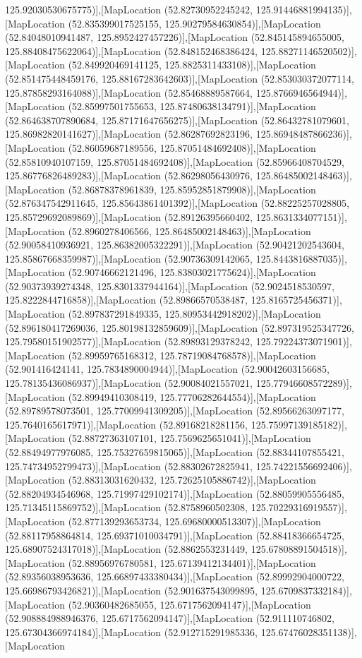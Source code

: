 125.92030530675775)],[MapLocation (52.82730952245242, 125.91446881994135)],[MapLocation (52.835399017525155, 125.90279584630854)],[MapLocation (52.84048010941487, 125.8952427457226)],[MapLocation (52.845145894655005, 125.88408475622064)],[MapLocation (52.848152468386424, 125.88271146520502)],[MapLocation (52.849920469141125, 125.8825311433108)],[MapLocation (52.851475448459176, 125.88167283642603)],[MapLocation (52.853030372077114, 125.87858293164088)],[MapLocation (52.85468889587664, 125.8766946564944)],[MapLocation (52.85997501755653, 125.87480638134791)],[MapLocation (52.864638707890684, 125.87171647656275)],[MapLocation (52.86432781079601, 125.86982820141627)],[MapLocation (52.86287692823196, 125.86948487866236)],[MapLocation (52.86059687189556, 125.87051484692408)],[MapLocation (52.85810940107159, 125.87051484692408)],[MapLocation (52.85966408704529, 125.86776826489283)],[MapLocation (52.86298056430976, 125.86485002148463)],[MapLocation (52.86878378961839, 125.85952851879908)],[MapLocation (52.876347542911645, 125.85643861401392)],[MapLocation (52.88225257028805, 125.85729692089869)],[MapLocation (52.89126395660402, 125.8631334077151)],[MapLocation (52.8960278406566, 125.86485002148463)],[MapLocation (52.90058410936921, 125.86382005322291)],[MapLocation (52.90421202543604, 125.85867668359987)],[MapLocation (52.90736309142065, 125.8443816887035)],[MapLocation (52.90746662121496, 125.83803021775624)],[MapLocation (52.90373939274348, 125.8301337944164)],[MapLocation (52.9024518530597, 125.8222844716858)],[MapLocation (52.89866570538487, 125.8165725456371)],[MapLocation (52.897837291849335, 125.80953442918202)],[MapLocation (52.896180417269036, 125.80198132859609)],[MapLocation (52.897319525347726, 125.79580151902577)],[MapLocation (52.89893129378242, 125.79224373071901)],[MapLocation (52.89959765168312, 125.78719084768578)],[MapLocation (52.901416424141, 125.7834890004944)],[MapLocation (52.90042603156685, 125.78135436086937)],[MapLocation (52.90084021557021, 125.77946608572289)],[MapLocation (52.89949410308419, 125.77706282644554)],[MapLocation (52.89789578073501, 125.77009941309205)],[MapLocation (52.89566263097177, 125.7640165617971)],[MapLocation (52.89168218281156, 125.75997139185182)],[MapLocation (52.88727363107101, 125.7569625651041)],[MapLocation (52.88494977976085, 125.75327659815065)],[MapLocation (52.88344107855421, 125.74734952799473)],[MapLocation (52.88302672825941, 125.74221556692406)],[MapLocation (52.88313031620432, 125.72625105886742)],[MapLocation (52.88204934546968, 125.71997429102174)],[MapLocation (52.88059905556485, 125.71345115869752)],[MapLocation (52.8758960502308, 125.70229316919557)],[MapLocation (52.877139293653734, 125.69680000513307)],[MapLocation (52.88117958864814, 125.69371010034791)],[MapLocation (52.88418366654725, 125.68907524317018)],[MapLocation (52.8862553231449, 125.67808891504518)],[MapLocation (52.88956976780581, 125.67139412134401)],[MapLocation (52.89356038953636, 125.66897433380434)],[MapLocation (52.89992904000722, 125.66986793426821)],[MapLocation (52.901637543099895, 125.6709837332184)],[MapLocation (52.90360482685055, 125.6717562094147)],[MapLocation (52.908884988946376, 125.6717562094147)],[MapLocation (52.911110746802, 125.67304366974184)],[MapLocation (52.912715291985336, 125.67476028351138)],[MapLocation 